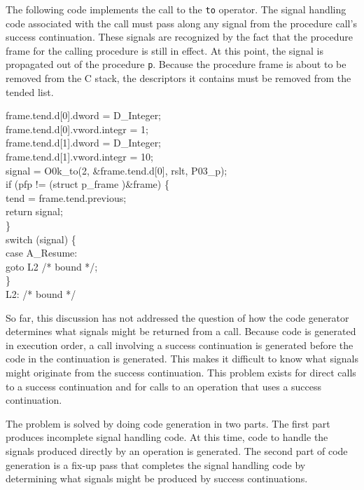 The following code implements the call to the \texttt{to}
operator. The signal handling code associated with the call must pass
along any signal from the procedure call's success continuation. These
signals are recognized by the fact that the procedure frame for the
calling procedure is still in effect. At this point, the signal is
propagated out of the procedure \texttt{p}. Because the procedure
frame is about to be removed from the C stack, the descriptors it
contains must be removed from the tended list.

\goodbreak
\begin{iconcode}
frame.tend.d[0].dword = D\_Integer;\\
frame.tend.d[0].vword.integr = 1;\\
frame.tend.d[1].dword = D\_Integer;\\
frame.tend.d[1].vword.integr = 10;\\
signal = O0k\_to(2, \&frame.tend.d[0], rslt, P03\_p);\\
if (pfp != (struct p\_frame )\&frame) \{\\
\>tend = frame.tend.previous;\\
\>return signal;\\
\>\}\\
switch (signal) \{\\
\>case A\_Resume:\\
\>\>goto L2 /* bound */;\\
\>\}\\
L2: /* bound */\\
\end{iconcode}


So far, this discussion has not addressed the question of how the code
generator determines what signals might be returned from a
call. Because code is generated in execution order, a call involving a
success continuation is generated before the code in the continuation
is generated. This makes it difficult to know what signals might
originate from the success continuation. This problem exists for
direct calls to a success continuation and for calls to an operation
that uses a success continuation.

The problem is solved by doing code generation in two parts. The first
part produces incomplete signal handling code. At this time, code to
handle the signals produced directly by an operation is generated. The
second part of code generation is a fix-up pass that completes the
signal handling code by determining what signals might be produced by
success continuations.

